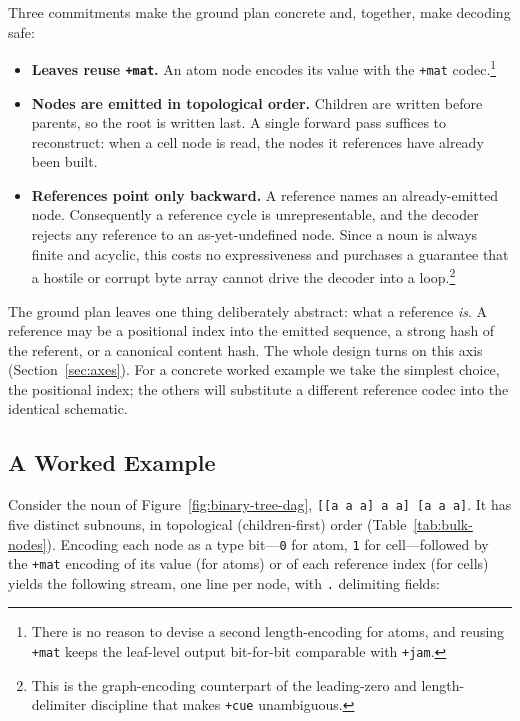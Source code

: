 \documentclass[twoside]{article}
\begin{document}
Three commitments make the ground plan concrete and, together, make decoding safe:

\begin{itemize}
\item  \textbf{Leaves reuse \texttt{+mat}.}  An atom node encodes its value with the \texttt{+mat} codec.\footnote{There is no reason to devise a second length-encoding for atoms, and reusing \texttt{+mat} keeps the leaf-level output bit-for-bit comparable with \texttt{+jam}.}
\item  \textbf{Nodes are emitted in topological order.}  Children are written before parents, so the root is written last.  A single forward pass suffices to reconstruct:  when a cell node is read, the nodes it references have already been built.
\item  \textbf{References point only backward.}  A reference names an already-emitted node.  Consequently a reference cycle is unrepresentable, and the decoder rejects any reference to an as-yet-undefined node.  Since a noun is always finite and acyclic, this costs no expressiveness and purchases a guarantee that a hostile or corrupt byte array cannot drive the decoder into a loop.\footnote{This is the graph-encoding counterpart of the leading-zero and length-delimiter discipline that makes \texttt{+cue} unambiguous.}
\end{itemize}

\noindent
The ground plan leaves one thing deliberately abstract:  what a reference \emph{is}.  A reference may be a positional index into the emitted sequence, a strong hash of the referent, or a canonical content hash.  The whole design turns on this axis (Section~\ref{sec:axes}).  For a concrete worked example we take the simplest choice, the positional index; the others will substitute a different reference codec into the identical schematic.

\subsection{A Worked Example}

Consider the noun of Figure~\ref{fig:binary-tree-dag}, \texttt{[[a a a] a a] [a a a]}.  It has five distinct subnouns, in topological (children-first) order (Table~\ref{tab:bulk-nodes}).  Encoding each node as a type bit---\texttt{0} for atom, \texttt{1} for cell---followed by the \texttt{+mat} encoding of its value (for atoms) or of each reference index (for cells) yields the following stream, one line per node, with \texttt{.} delimiting fields:
\end{document}
